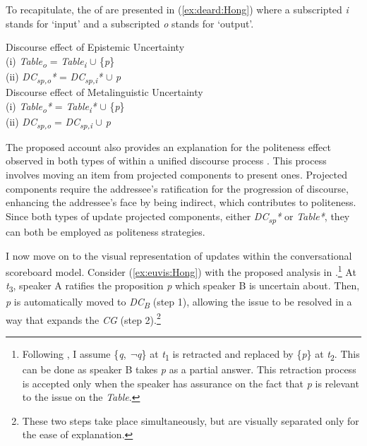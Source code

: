 \documentclass[output=paper,colorlinks,citecolor=brown]{langscibook}
\begin{document}
To recapitulate, the  of  are presented in (\ref{ex:deard:Hong}) where a subscripted \textit{i} stands for ‘input’ and a subscripted \textit{o} stands for ‘output’.

\ea \label{ex:deard:Hong}
    \ea \label{ex:dearda:Hong} Discourse effect of Epistemic Uncertainty \\
    (i) \textit{Table\textsubscript{o}} = \textit{Table\textsubscript{i}} $\cup$ \{\textit{p}\}\\
    (ii) \textit{DC\textsubscript{sp,o}*} = \textit{DC\textsubscript{sp,i}*} $\cup$ \textit{p}\\
    \ex \label{ex:deardb:Hong} Discourse effect of Metalinguistic Uncertainty \\
    (i) \textit{Table\textsubscript{o}*} = \textit{Table\textsubscript{i}*} $\cup$ \{\textit{p}\}\\
    (ii) \textit{DC\textsubscript{sp,o}} = \textit{DC\textsubscript{sp,i}} $\cup$ \textit{p}\\
    \z
\z

The proposed account also provides an explanation for the politeness effect observed in both types of  within a unified discourse process \citep[cf., e.g.,][]{jeong2021deriving}. This process involves moving an item from projected components to present ones. Projected components require the addressee’s ratification for the progression of discourse, enhancing the addressee’s face by being indirect, which contributes to politeness. Since both types of  update projected components, either \textit{DC\textsubscript{sp}*} or \textit{Table*}, they can both be employed as politeness strategies.

I now move on to the visual representation of updates within the conversational scoreboard model. Consider (\ref{ex:euvis:Hong}) with the proposed analysis in .\footnote{Following \citet{jeong2018intonation}, I assume \{\textit{q}, \textit{¬q}\} at \textit{t}\textsubscript{1} is retracted and replaced by \{\textit{p}\} at \textit{t}\textsubscript{2}. This can be done as speaker B takes \textit{p} as a partial answer. This retraction process is accepted only when the speaker has assurance on the fact that \textit{p} is relevant to the issue on the \textit{Table}.} At \textit{t}\textsubscript{3}, speaker A ratifies the proposition \textit{p} which speaker B is uncertain about. Then, \textit{p} is automatically moved to \textit{DC\textsubscript{B}} (step 1), allowing the issue to be resolved in a way that expands the \textit{CG} (step 2).\footnote{These two steps take place simultaneously, but are visually separated only for the ease of explanation.}
\end{document}
